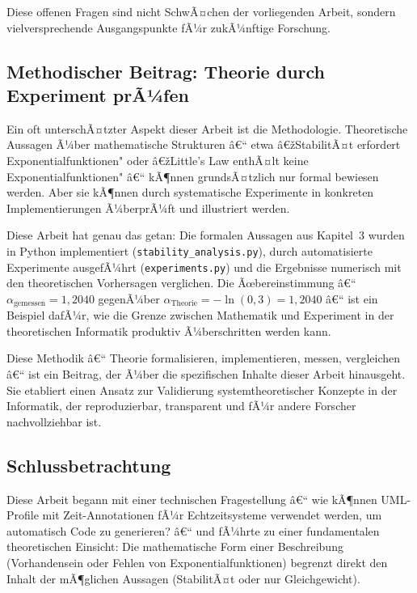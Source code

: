 ﻿\documentclass[a4paper,12pt]{report}
\theoremstyle{definition}
\begin{document}
Diese offenen Fragen sind nicht SchwÃ¤chen der vorliegenden Arbeit, sondern
vielversprechende Ausgangspunkte fÃ¼r zukÃ¼nftige Forschung.

\subsection{Methodischer Beitrag: Theorie durch Experiment prÃ¼fen}

Ein oft unterschÃ¤tzter Aspekt dieser Arbeit ist die Methodologie.
Theoretische Aussagen Ã¼ber mathematische Strukturen â€“ etwa â€žStabilitÃ¤t
erfordert Exponentialfunktionen" oder â€žLittle's Law enthÃ¤lt keine
Exponentialfunktionen" â€“ kÃ¶nnen grundsÃ¤tzlich nur formal bewiesen werden.
Aber sie kÃ¶nnen durch systematische Experimente in konkreten
Implementierungen Ã¼berprÃ¼ft und illustriert werden.

Diese Arbeit hat genau das getan: Die formalen Aussagen aus Kapitel~3 wurden
in Python implementiert (\texttt{stability\_analysis.py}), durch automatisierte
Experimente ausgefÃ¼hrt (\texttt{experiments.py}) und die Ergebnisse numerisch
mit den theoretischen Vorhersagen verglichen.  Die Ãœbereinstimmung â€“
$\alpha_\text{gemessen} = 1{,}2040$ gegenÃ¼ber $\alpha_\text{Theorie} =
-\ln(0{,}3) = 1{,}2040$ â€“ ist ein Beispiel dafÃ¼r, wie die Grenze zwischen
Mathematik und Experiment in der theoretischen Informatik produktiv Ã¼berschritten
werden kann.

Diese Methodik â€“ Theorie formalisieren, implementieren, messen, vergleichen â€“
ist ein Beitrag, der Ã¼ber die spezifischen Inhalte dieser Arbeit hinausgeht.
Sie etabliert einen Ansatz zur Validierung systemtheoretischer Konzepte in
der Informatik, der reproduzierbar, transparent und fÃ¼r andere Forscher
nachvollziehbar ist.

\subsection{Schlussbetrachtung}

Diese Arbeit begann mit einer technischen Fragestellung â€“ wie kÃ¶nnen
UML-Profile mit Zeit-Annotationen fÃ¼r Echtzeitsysteme verwendet werden,
um automatisch Code zu generieren? â€“ und fÃ¼hrte zu einer fundamentalen
theoretischen Einsicht: Die mathematische Form einer Beschreibung
(Vorhandensein oder Fehlen von Exponentialfunktionen) begrenzt direkt
den Inhalt der mÃ¶glichen Aussagen (StabilitÃ¤t oder nur Gleichgewicht).
\end{document}
